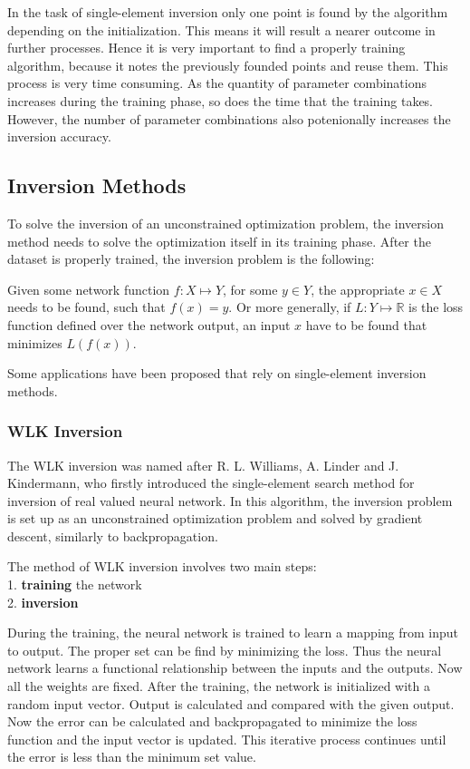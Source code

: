 In the task of single-element inversion only one point is found by the algorithm depending on the initialization. This means it will result a nearer outcome in further processes. Hence it is very important to find a properly training algorithm, because it notes the previously founded points and reuse them. This process is very time consuming. As the quantity of parameter combinations increases during the training phase, so does the time that the training takes. However, the number of parameter combinations also potenionally increases the inversion accuracy.



\subsection{Inversion Methods}

To solve the inversion of an unconstrained optimization problem, the inversion method needs to solve the optimization itself in its training phase. After the dataset is properly trained, the inversion problem is the following:

Given some network function $f : X \mapsto Y$, for some $y \in Y$, the appropriate $x \in X$ needs to be found, such that $f(x) = y$. Or more generally, if $L : Y \mapsto \mathbb{R}$ is the loss function defined over the network output, an input $x$ have to be found that minimizes $L(f(x))$. \smallskip

Some applications have been proposed that rely on single-element inversion methods.


\subsubsection{WLK Inversion}

The WLK inversion was named after R. L. Williams, A. Linder and J.
Kindermann, who firstly introduced the single-element search method for inversion of real valued neural network. In this algorithm, the inversion problem is set up as an unconstrained optimization problem and solved by gradient descent, similarly to backpropagation. \medskip

\noindent The method of WLK inversion involves two main steps: \\
1. \textbf{training} the network \\
2. \textbf{inversion}\medskip

During the training, the neural network is trained to learn a mapping from input to output. The proper set can be find by minimizing the loss. Thus the neural network learns a functional relationship between the inputs and the outputs. Now all the weights are fixed. After the training, the network is initialized with a random input vector. Output is calculated and compared with the given output. Now the error can be calculated and backpropagated to minimize the loss function and the input vector is updated. This iterative process continues until the error is less than the minimum set value.\medskip


